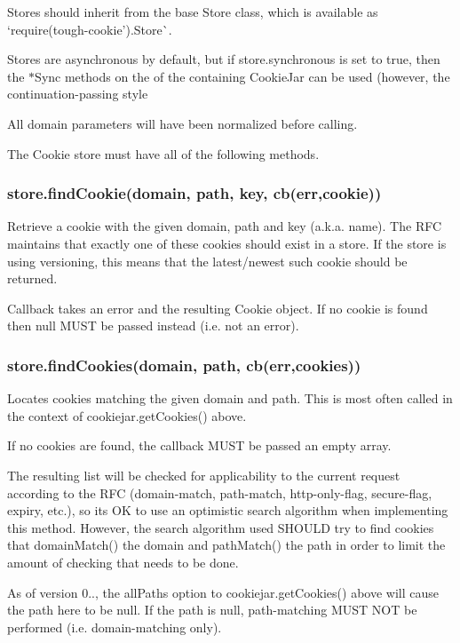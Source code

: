 Stores should inherit from the base {\ttfamily Store} class, which is available as `require(\textquotesingle{}tough-\/cookie').Store\`{}.

Stores are asynchronous by default, but if {\ttfamily store.\+synchronous} is set to {\ttfamily true}, then the {\ttfamily $\ast$\+Sync} methods on the of the containing {\ttfamily Cookie\+Jar} can be used (however, the continuation-\/passing style

All {\ttfamily domain} parameters will have been normalized before calling.

The Cookie store must have all of the following methods.

\subsubsection*{{\ttfamily store.\+find\+Cookie(domain, path, key, cb(err,cookie))}}

Retrieve a cookie with the given domain, path and key (a.\+k.\+a. name). The R\+FC maintains that exactly one of these cookies should exist in a store. If the store is using versioning, this means that the latest/newest such cookie should be returned.

Callback takes an error and the resulting {\ttfamily Cookie} object. If no cookie is found then {\ttfamily null} M\+U\+ST be passed instead (i.\+e. not an error).

\subsubsection*{{\ttfamily store.\+find\+Cookies(domain, path, cb(err,cookies))}}

Locates cookies matching the given domain and path. This is most often called in the context of {\ttfamily cookiejar.\+get\+Cookies()} above.

If no cookies are found, the callback M\+U\+ST be passed an empty array.

The resulting list will be checked for applicability to the current request according to the R\+FC (domain-\/match, path-\/match, http-\/only-\/flag, secure-\/flag, expiry, etc.), so it\textquotesingle{}s OK to use an optimistic search algorithm when implementing this method. However, the search algorithm used S\+H\+O\+U\+LD try to find cookies that {\ttfamily domain\+Match()} the domain and {\ttfamily path\+Match()} the path in order to limit the amount of checking that needs to be done.

As of version 0.., the {\ttfamily all\+Paths} option to {\ttfamily cookiejar.\+get\+Cookies()} above will cause the path here to be {\ttfamily null}. If the path is {\ttfamily null}, path-\/matching M\+U\+ST N\+OT be performed (i.\+e. domain-\/matching only).

